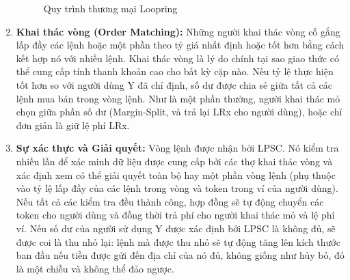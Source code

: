 \documentclass[12pt,a4paper]{article}
\begin{document}
\begin{multicols}{2}
\begin{enumerate}[topsep=-5pt,itemsep=1ex,partopsep=5ex,parsep=1ex]
\begin{center}
\begin{figure}[H]

\caption{Quy trình thương mại Loopring }
\label{fig:process}
\end{figure}
\end{center}
\item \textbf{Khai thác vòng (Order Matching):  }Những người khai thác vòng cố gắng lấp đầy các lệnh hoặc một phần theo tỷ giá nhất định hoặc tốt hơn bằng cách kết hợp nó với nhiều lệnh. Khai thác vòng là lý do chính tại sao giao thức có thể cung cấp tính thanh khoản cao cho bất kỳ cặp nào. Nếu tỷ lệ thực hiện tốt hơn so với người dùng Y đã chỉ định, số dư được chia sẻ giữa tất cả các lệnh mua bán trong vòng lệnh. Như là một phần thưởng, người khai thác mỏ chọn giữa phần số dư (Margin-Split, và trả lại LRx cho người dùng), hoặc chỉ đơn giản là giữ lệ phí LRx.

\item \textbf{Sự xác thực và Giải quyết: }Vòng lệnh được nhận bởi LPSC. Nó kiểm tra nhiều lần để xác minh dữ liệu được cung cấp bởi các thợ khai thác vòng và xác định xem có thể giải quyết toàn bộ hay một phần vòng lệnh (phụ thuộc vào tỷ lệ lấp đầy của các lệnh trong vòng và token trong ví của người dùng). Nếu tất cả các kiểm tra đều thành công, hợp đồng sẽ tự động chuyển các token cho người dùng và đồng thời trả phí cho người khai thác mỏ và lệ phí ví. Nếu số dư của người sử dụng Y được xác định bởi LPSC là không đủ, sẽ được coi là thu nhỏ lại: lệnh mà được thu nhỏ sẽ tự động tăng lên kích thước ban đầu nếu tiền được gửi đến địa chỉ của nó đủ, không giống như hủy bỏ, đó là một chiều và không thể đảo ngược.



\end{enumerate}
\end{multicols}
\end{document}

